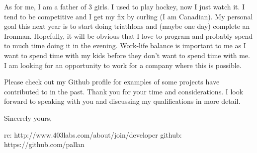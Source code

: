 \documentclass[11pt]{letter} %
\begin{document}
\begin{letter}{}
As for me, I am a father of 3 girls. I used to play hockey, now I just watch it. I tend to be competitive and I get my fix by curling (I am Canadian). My  personal goal this next year is to start doing triathlons and (maybe one day) complete an Ironman. Hopefully, it will be obvious that I love to program and probably spend to much time doing it in the evening. Work-life balance is important to me as I want to spend time with my kids before they don't want to spend time with me. I am looking for an opportunity to work for a company where this is possible.

Please check out my Github profile for examples of some projects have contributed to in the past. Thank you for your time and considerations. I look forward to speaking with you and discussing my qualifications in more detail.

\closing{Sincerely yours,}



re: http://www.403labs.com/about/join/developer
github: https://github.com/pallan


\end{letter}
\end{document}
